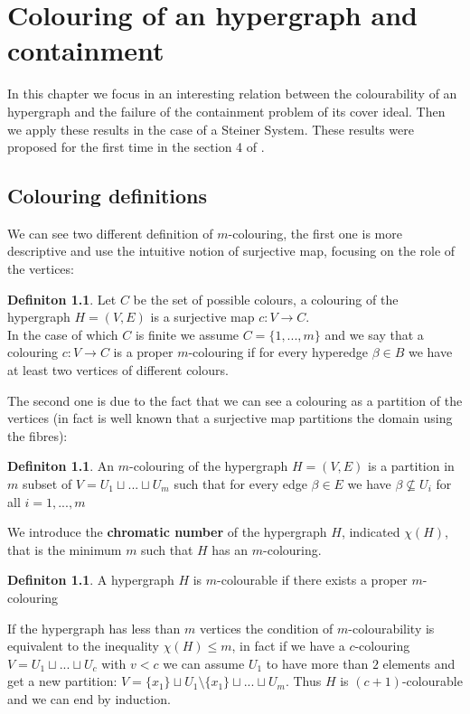 \documentclass[notitlepage, a4]{book}
\theoremstyle{plain}
\theoremstyle{remark}
\theoremstyle{definition}
\newtheorem{deff}[teo]{Definiton}
\begin{document}
 

\chapter{Colouring of an hypergraph and containment}

In this chapter we focus in an interesting relation between the colourability of an hypergraph and  the failure of the containment problem of its cover ideal. Then we apply these results in the case of a Steiner System. These results were proposed for the first time in the section 4 of \cite{Bal21Steiner}.
 
\section{Colouring definitions}

We can see two different definition of $ m $-colouring, the first one is more descriptive and use the intuitive notion of surjective map, focusing on the role of the vertices: 
\begin{deff}\label{def:colouring1}
Let $ C $ be the set of possible colours, a colouring of the hypergraph $ H = (V,E) $ is a surjective map $ c : V \to C $. \\
In the case of which $ C $ is finite we assume $ C = \{ 1 , ... , m\} $ and we say that a colouring $ c : V \to C $ is a proper $ m $-colouring if for every hyperedge $ \beta \in B $ we have at least two vertices of different colours. 
\end{deff}

The second one is due to the fact that we can see a colouring as a partition of the vertices (in fact is well known that a surjective map partitions the domain using the fibres):

\begin{deff}
An $ m $-colouring of the hypergraph $ H = (V,E) $ is a partition in $ m $ subset of $ V = U_1 \sqcup ... \sqcup U_m $ such that for every edge $ \beta \in E $ we have $ \beta \not \subseteq U_i $ for all $ i = 1, ... , m $
\end{deff}
 
We introduce the \textbf{chromatic number} of the hypergraph $ H $, indicated $ \chi(H) $, that is the minimum $ m $ such that $ H $ has an $ m $-colouring.

\begin{deff}
A hypergraph $ H $ is $ m $-colourable if there exists a proper $ m $-colouring
\end{deff}

If the hypergraph has less than $ m $ vertices the condition of $ m $-colourability is equivalent to the inequality $ \chi(H) \leq m $, in fact if we have a $ c $-colouring $ V = U_1 \sqcup ... \sqcup U_c $ with $ v < c $ we can assume $ U_1 $ to have more than $ 2 $ elements and get a new partition: $ V = \{x_1\} \sqcup U_1 \setminus \{x_1\} \sqcup ... \sqcup U_m $. Thus $ H $ is $ (c+1) $-colourable and we can end by induction.
\end{document}
